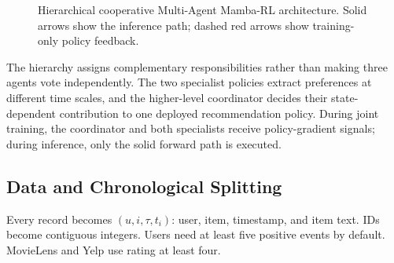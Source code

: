 \documentclass[11pt,a4paper]{article}
\begin{document}
\begin{figure}[H]
{}
\caption{Hierarchical cooperative Multi-Agent Mamba-RL architecture. Solid arrows
show the inference path; dashed red arrows show training-only policy feedback.}
\label{fig:pipeline}
\end{figure}

The hierarchy assigns complementary responsibilities rather than making three
agents vote independently. The two specialist policies extract preferences at
different time scales, and the higher-level coordinator decides their
state-dependent contribution to one deployed recommendation policy. During joint
training, the coordinator and both specialists receive policy-gradient signals;
during inference, only the solid forward path is executed.

\subsection{Data and Chronological Splitting}

Every record becomes $(u,i,\tau,t_i)$: user, item, timestamp, and item text. IDs become contiguous integers. Users need at least five positive events by default. MovieLens and Yelp use rating at least four.
\end{document}
